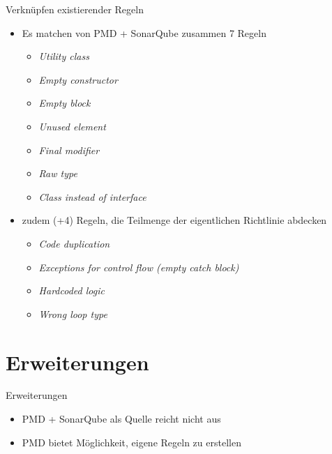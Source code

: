 \documentclass{sdqbeamer}
\begin{document}
\begin{frame}{Verknüpfen existierender Regeln}
	\begin{itemize}
		\item Es matchen von PMD + SonarQube zusammen 7 Regeln
            \begin{itemize}
                \item \textit{Utility class}
                \item \textit{Empty constructor}
                \item \textit{Empty block}
                \item \textit{Unused element}
                \item \textit{Final modifier}
                \item \textit{Raw type}
                \item \textit{Class instead of interface}
            \end{itemize}
            \item zudem (+4) Regeln, die Teilmenge der eigentlichen Richtlinie 
            abdecken
            \begin{itemize}
                \item \textit{Code duplication}
                \item \textit{Exceptions for control flow (empty catch block)}
                \item \textit{Hardcoded logic}
                \item \textit{Wrong loop type}
            \end{itemize}
	\end{itemize}
\end{frame}

\section{Erweiterungen}
\begin{frame}{Erweiterungen}
	\begin{itemize}
		\item PMD + SonarQube als Quelle reicht nicht aus
            \item PMD bietet Möglichkeit, eigene Regeln zu erstellen
	\end{itemize}
\end{frame}
\end{document}
